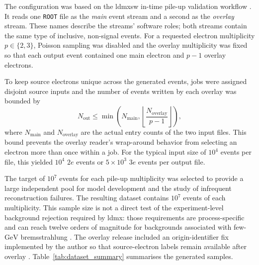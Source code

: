 The configuration was based on the \gls{ldmxsw} in-time pile-up
validation workflow \cite{ldmx-github-itpileup}. It reads one \texttt{ROOT} file as the
\emph{main} event stream and a second as the \emph{overlay} stream. These names
describe the streams' software roles; both streams contain the same type of
inclusive, non-signal events. For a requested electron multiplicity
\(p\in\{2,3\}\), Poisson sampling was disabled and the overlay multiplicity was
fixed so that each output event contained one main electron and \(p-1\)
overlay electrons. 

To keep source electrons unique across the generated events, jobs were
assigned disjoint source inputs and the number of events written by each
overlay was bounded by
\begin{equation}
    N_{\mathrm{out}}
    \leq
    \min\left(
        N_{\mathrm{main}},
        \left\lfloor
            \frac{N_{\mathrm{overlay}}}{p-1}
        \right\rfloor
    \right),
\end{equation}
where \(N_{\mathrm{main}}\) and \(N_{\mathrm{overlay}}\) are the actual entry
counts of the two input files. This bound prevents the overlay reader's
wrap-around behavior from selecting an electron more than once within a job.
For the typical input size of \(10^4\) events per file, this yielded \(10^4\)
\(2e\) events or \(5\times10^3\) \(3e\) events per output file.

The target of \(10^7\) events for each pile-up multiplicity was selected to
provide a large independent pool for model development and the study of
infrequent reconstruction failures. The resulting dataset contains
\(10^7\) events of each multiplicity. This sample size is not a direct test of the
experiment-level background rejection required by \gls{ldmx}: those
requirements are
process-specific and can reach twelve orders of magnitude for backgrounds
associated with few-\(\mathrm{GeV}\) bremsstrahlung
\cite{akesson2020-photon-veto}. 
The overlay release included an origin-identifier fix implemented by the
author so that source-electron labels remain available after overlay
\cite{petren2026-ldmx-origin-id-pr}. Table~\ref{tab:dataset_summary}
summarises the generated samples.


